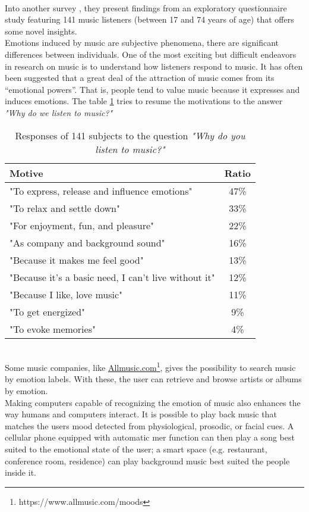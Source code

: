 \\
Into another survey \cite{juslin2004expression}, they present findings from an exploratory questionnaire study featuring 141 music listeners (between 17 and 74 years of age) that offers some novel insights. 
\\
Emotions induced by music are subjective phenomena, there are significant differences between individuals. One of the most exciting but difficult endeavors in research on music is to understand how listeners respond to music. It has often been suggested that a great deal of the attraction of music comes from its “emotional powers”. That is, people tend to value music because it expresses and induces emotions.
The table  \ref{table:motivation_music} tries to resume the motivations to the answer \textit{"Why do we listen to music?"}
\begin{table}[h!]
	\centering
	\begin{tabular}{|l | c|}
		\hline
		Motive & Ratio\\ [0.5ex] 
		\hline\hline "To express, release and influence emotions"	&	47\%	\\ 
		\hline "To relax and settle down"										&	33\%	\\
		\hline "For enjoyment, fun, and pleasure"							&	22\%	\\
		\hline "As company and background sound"						&	16\%	\\
		\hline "Because it makes me feel good"								&	13\%	\\
		\hline "Because it's a basic need, I can't live without it"		&	12\%	\\
		\hline "Because I like, love music"										&	11\%	\\
		\hline "To get energized"													&	9\%	\\
		\hline "To evoke memories"												&	4\%	\\ 
		\hline
	\end{tabular}
	\caption{Responses of 141 subjects to the question \textit{"Why do you listen to music?"}}
	\label{table:motivation_music}
\end{table}
\\ \indent
Some music companies, like  \href{https://www.allmusic.com/moods}{Allmusic.com}\footnote{https://www.allmusic.com/moods}, gives the possibility to search music by emotion labels. With these, the user can retrieve and browse artists or albums by emotion.
\\ \indent
Making computers capable of recognizing the emotion of music also enhances the way humans and computers interact. It is possible to play back music that matches the users mood detected from physiological, prosodic, or facial cues. A cellular phone equipped with automatic \gls{mer} function can then play a song best suited to the emotional state of the user; a smart space (e.g. restaurant, conference room, residence) can play background music best suited the people inside it.

